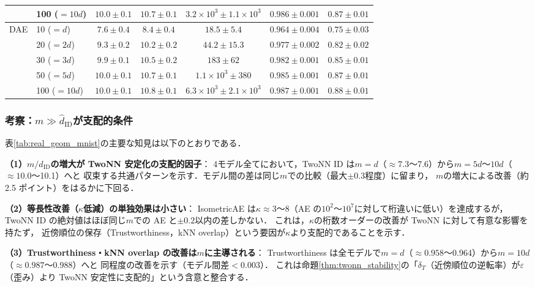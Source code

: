 \documentclass[11pt,a4paper]{jsarticle}
\newcommand{\kap}{\kappa}
\begin{document}
\begin{table}[H]
\begin{tabular}{llccccc}
 & 100 ($=10d$) & $10.0\pm0.1$ & $10.7\pm0.1$ & $3.2\times10^3\pm 1.1\times10^3$ & $0.986\pm0.001$ & $0.87\pm0.01$ \\
\midrule
\multirow{5}{*}{DAE}
 & 10 ($=d$)    & $7.6\pm0.4$ & $8.4\pm0.4$ & $18.5\pm5.4$ & $0.964\pm0.004$ & $0.75\pm0.03$ \\
 & 20 ($=2d$)   & $9.3\pm0.2$ & $10.2\pm0.2$ & $44.2\pm15.3$ & $0.977\pm0.002$ & $0.82\pm0.02$ \\
 & 30 ($=3d$)   & $9.9\pm0.1$ & $10.5\pm0.2$ & $183\pm62$ & $0.982\pm0.001$ & $0.85\pm0.01$ \\
 & 50 ($=5d$)   & $10.0\pm0.1$ & $10.7\pm0.1$ & $1.1\times10^3\pm 380$ & $0.985\pm0.001$ & $0.87\pm0.01$ \\
 & 100 ($=10d$) & $10.0\pm0.1$ & $10.8\pm0.1$ & $6.3\times10^3\pm 2.1\times10^3$ & $0.987\pm0.001$ & $0.88\pm0.01$ \\
\bottomrule
\end{tabular}
\end{table}

\subsubsection*{考察：$m \gg \hat{d}_\mathrm{ID}$が支配的条件}

表\ref{tab:real_geom_mnist}の主要な知見は以下のとおりである．

\textbf{（1）$m/\hat{d}_\mathrm{ID}$の増大が TwoNN 安定化の支配的因子}：
4モデル全てにおいて，TwoNN ID は$m=d$（$\approx 7.3$〜7.6）から$m=5d$〜$10d$（$\approx 10.0$〜10.1）へと
収束する共通パターンを示す．モデル間の差は同じ$m$での比較（最大$\pm0.3$程度）に留まり，
$m$の増大による改善（約 2.5 ポイント）をはるかに下回る．

\textbf{（2）等長性改善（$\kap$低減）の単独効果は小さい}：
IsometricAE は$\kap \approx 3$〜8（AE の$10^2$〜$10^7$に対して桁違いに低い）を達成するが，
TwoNN ID の絶対値はほぼ同じ$m$での AE と$\pm 0.2$以内の差しかない．
これは，$\kap$の桁数オーダーの改善が TwoNN に対して有意な影響を持たず，
近傍順位の保存（Trustworthiness，kNN overlap）という要因が$\kap$より支配的であることを示す．

\textbf{（3）Trustworthiness・kNN overlap の改善は$m$に主導される}：
Trustworthiness は全モデルで$m=d$（$\approx 0.958$〜0.964）から$m=10d$（$\approx 0.987$〜0.988）へと
同程度の改善を示す（モデル間差$< 0.003$）．
これは命題\ref{thm:twonn_stability}の「$\delta_T$（近傍順位の逆転率）が$\varepsilon$（歪み）より
TwoNN 安定性に支配的」という含意と整合する．
\end{document}
